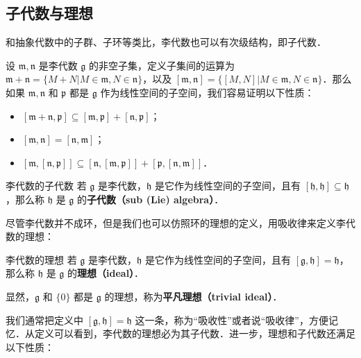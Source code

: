 




\subsection{子代数与理想}
和抽象代数中的子群、子环等类比，李代数也可以有次级结构，即子代数．

设 $\mathfrak{m}, \mathfrak{n}$ 是李代数 $\mathfrak{g}$ 的非空子集，定义子集间的运算为 $\mathfrak{m}+\mathfrak{n}=\{M+N|M\in\mathfrak{m}, N\in\mathfrak{n}\}$，以及 $[\mathfrak{m}, \mathfrak{n}]=\{[M, N]|M\in\mathfrak{m}, N\in\mathfrak{n}\}$．那么如果 $\mathfrak{m}, \mathfrak{n}$ 和 $\mathfrak{p}$ 都是 $\mathfrak{g}$ 作为线性空间的子空间，我们容易证明以下性质：

\begin{itemize}
\item $[\mathfrak{m}+\mathfrak{n}, \mathfrak{p}]\subseteq[\mathfrak{m}, \mathfrak{p}]+[\mathfrak{n}, \mathfrak{p}]$；
\item $[\mathfrak{m},\mathfrak{n}]=[\mathfrak{n}, \mathfrak{m}]$；
\item $[\mathfrak{m}, [\mathfrak{n}, \mathfrak{p}]]\subseteq[\mathfrak{n}, [\mathfrak{m}, \mathfrak{p}]]+[\mathfrak{p}, [\mathfrak{n}, \mathfrak{m}]]$．
\end{itemize}

\begin{definition}{李代数的子代数}
若 $\mathfrak{g}$ 是李代数，$\mathfrak{h}$ 是它作为线性空间的子空间，且有 $[\mathfrak{h}, \mathfrak{h}]\subseteq\mathfrak{h}$，那么称 $\mathfrak{h}$ 是 $\mathfrak{g}$ 的\textbf{子代数（sub (Lie) algebra）}．
\end{definition}


尽管李代数并不成环，但是我们也可以仿照环的理想的定义，用吸收律来定义李代数的理想：

\begin{definition}{李代数的理想}
若 $\mathfrak{g}$ 是李代数，$\mathfrak{h}$ 是它作为线性空间的子空间，且有 $[\mathfrak{g}, \mathfrak{h}]=\mathfrak{h}$，那么称 $\mathfrak{h}$ 是 $\mathfrak{g}$ 的\textbf{理想（ideal）}．

显然，$\mathfrak{g}$ 和 $\{0\}$ 都是 $\mathfrak{g}$ 的理想，称为\textbf{平凡理想（trivial ideal）}．
\end{definition}

我们通常把定义中 $[\mathfrak{g}, \mathfrak{h}]=\mathfrak{h}$ 这一条，称为“吸收性”或者说“吸收律”，方便记忆．从定义可以看到，李代数的理想必为其子代数．进一步，理想和子代数还满足以下性质：

